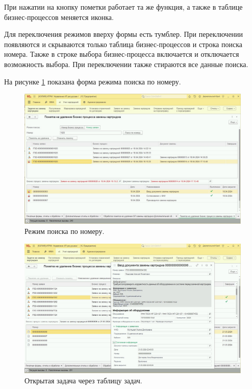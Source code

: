     При нажатии на кнопку пометки работает та же функция, а также в таблице бизнес-процессов меняется иконка.

    Для переключения режимов вверху формы есть тумблер. При переключении появляются и скрываются только таблица бизнес-процессов и строка поиска номера. Также в строке выбора бизнес-процесса включается и отключается возможность выбора. При переключении также стираются все данные поиска.

    На рисунке \ref{list} показана форма режима поиска по номеру.

    \begin{figure}[H]
        \centering
        \includegraphics[width=14cm]{pictures/interf_list.png}
        \caption{Режим поиска по номеру.}  \label{list}
    \end{figure}

    \begin{figure}[H]
        \centering
        \includegraphics[width=14cm]{pictures/clicked.png}
        \caption{Открытая задача через таблицу задач.}  \label{clicked}
    \end{figure}

